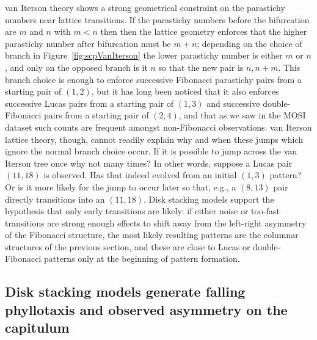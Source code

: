 van Iterson theory shows a strong geometrical constraint on the parastichy numbers near lattice transitions. If the parastichy numbers before the bifurcation are $m$ and $n$ with $m<n$ then then the lattice geometry enforces that the higher parastichy number after bifurcation must be $m+n$; depending on the choice of branch in Figure~\ref{fig:scpVanIterson} the lower parastichy number is either $m$ or $n$, and only on the opposed branch is it $n$ so that the new pair is $n,n+m$. This branch choice is enough to enforce successive Fibonacci parastichy pairs from a starting pair of $(1,2)$, but it has long  been noticed that it also enforces successive Lucas pairs from a starting pair of $(1,3)$ and successive double-Fibonacci pairs from a starting pair of $(2,4)$, and that as we saw in the MOSI dataset such counts are frequent amongst non-Fibonacci observations. van Iterson lattice theory, though, cannot readily explain why and when these jumps which  ignore the normal branch choice occur.  If  it is possible to jump across the van Iterson tree once why not many times? In other words, suppose a Lucas pair $(11,18)$ is observed. Has that indeed evolved from an initial $(1,3)$ pattern? Or is it more likely for the jump to occur later so that, e.g., a $(8,13)$ pair directly transitions into an $(11,18)$. 
Disk stacking models support the hypothesis that only early transitions are likely: if either noise or too-fast transitions are strong enough effects to shift away from the left-right asymmetry of the  Fibonacci structure, the most likely resulting patterns are the columnar structures of the previous section, and these are close to Lucas or double-Fibonacci patterns only at the beginning of pattern formation. 


\subsection{Disk stacking models generate falling phyllotaxis and observed asymmetry on the capitulum}

